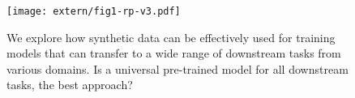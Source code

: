 \begin{figure}[t]
    \centering
    \texttt{[image: extern/fig1-rp-v3.pdf]}
   \vspace{-6mm}
    \caption{\small We explore how synthetic data can be effectively used for training models that can transfer to a wide range of downstream tasks from various domains. Is a universal pre-trained model for all downstream tasks, the best approach?}
    \label{fig:fig1} \vspace{-2mm}
\end{figure}